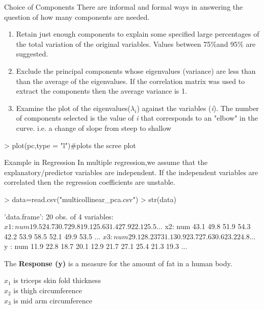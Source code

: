 \documentclass[10pt]{beamer}
\begin{document}
\begin{frame}[fragile]{Choice of Components}
There are informal and formal ways in answering the question of how many components are needed.
\begin{enumerate}
\item Retain just enough components to explain some specified large percentages of the total variation of the original variables. Values between 75\%and 95\% are  suggested.
\item Exclude the principal components whose eigenvalues (variance) are less than than the average of the eigenvalues. If the correlation matrix was used to extract the components then the average variance is 1.
\item Examine the plot of the eigenvalues($\lambda_{i}$) against the variables (\textit{i}). The number of components selected is the value of \textit{i} that corresponds to an "elbow" in the curve. i.e. a change of slope from steep to shallow
\end{enumerate}
\begin{Schunk}
\begin{Sinput}
> plot(pc,type = "l")#plots the scree plot
\end{Sinput}
\end{Schunk}

\end{frame}


\begin{frame}[fragile]{Example in Regression}
In multiple regression,we assume that the explanatory/predictor variables are independent. If the independent variables are correlated then the regression coefficients are unstable.
\begin{Schunk}
\begin{Sinput}
> data=read.csv("multicollinear_pca.csv")
> str(data)
\end{Sinput}
\begin{Soutput}
'data.frame':	20 obs. of  4 variables:
 $ x1: num  19.5 24.7 30.7 29.8 19.1 25.6 31.4 27.9 22.1 25.5 ...
 $ x2: num  43.1 49.8 51.9 54.3 42.2 53.9 58.5 52.1 49.9 53.5 ...
 $ x3: num  29.1 28.2 37 31.1 30.9 23.7 27.6 30.6 23.2 24.8 ...
 $ y : num  11.9 22.8 18.7 20.1 12.9 21.7 27.1 25.4 21.3 19.3 ...
\end{Soutput}
\end{Schunk}
The \textbf{Response (y)} is a measure for the amount of fat in a human body.
\begin{center}
$x_{1}$ is triceps skin fold thickness\\
$x_{2}$ is thigh circumference\\
$x_{3}$ is mid arm circumference\\
\end{center}
\end{frame}
\end{document}
